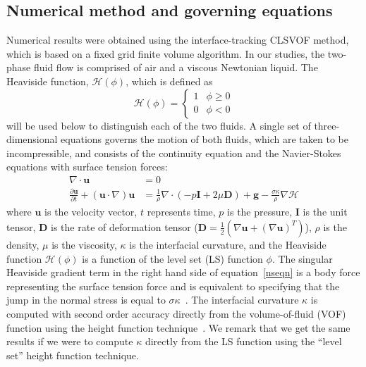 \documentclass[%
 reprint,
 showkeys,
 amsmath,amssymb,
 aps,
 prfluids,
 onecolumn
]{revtex4-2}
\newcommand{\Hea}{\mathcal{H}}
\newcommand{\vv}{\mathbf}
\newcommand{\bmD}{\vv{D}}
\newcommand{\bmg}{\vv{g}}
\newcommand{\bmI}{\vv{I}}
\newcommand{\bmu}{\vv{u}}
\begin{document}
\subsection{Numerical method and governing equations}
Numerical results were obtained using the interface-tracking CLSVOF method,
which is based on a fixed grid finite volume algorithm.  In our studies,
the two-phase fluid flow is comprised of air and a 
viscous Newtonian liquid.  The
Heaviside function, $\Hea(\phi)$, which is defined as
%
\begin{equation}\label{heavyeqn}
  \Hea(\phi) = \begin{cases}
               1 & \phi \geq 0 \\
               0 & \phi <0 
               \end{cases}
\end{equation}
%
will be used below to distinguish each of the two fluids.  A single set of
three-dimensional equations governs the motion of both fluids, which are taken
to be incompressible, and consists of the continuity equation and the
Navier-Stokes equations with surface tension forces:
%
\begin{align}
  \nabla\cdot\bmu &=0  \label{divu} \\
  \frac{\partial\bmu}{\partial t}+(\bmu\cdot\nabla)\bmu &=
  \frac{1}{\rho}\nabla\cdot(-p\bmI+2\mu\bmD)+\bmg-
  \frac{\sigma\kappa}{\rho}\nabla \Hea  \label{nseqn}
\end{align}
%
%
where $\bmu$ is the velocity vector, $t$ represents time, $p$ is the pressure,
$\bmI$ is the unit tensor, $\bmD$ is the rate of deformation tensor
($\bmD=\frac{1}{2}(\nabla\bmu+(\nabla\bmu)^{T})$), $\rho$ is the density, $\mu$
is the viscosity, $\kappa$ is the interfacial curvature, and the Heaviside
function $\Hea(\phi)$ is a function of the level set (LS) function $\phi$. The
singular Heaviside gradient term in the right hand side of
equation~\eqref{nseqn} is a body force representing the surface tension force
and is equivalent
to specifying that the jump in the normal stress is equal to
$\sigma\kappa$~\cite{TanguyEtAl2007}.  The interfacial curvature $\kappa$ is
computed with second order accuracy directly from the volume-of-fluid (VOF)
function using the height function technique~\cite{sussman2003second}.  
We remark that we get the same
results if we were to compute $\kappa$ directly from the LS function using the
``level set'' height function technique.
\end{document}
